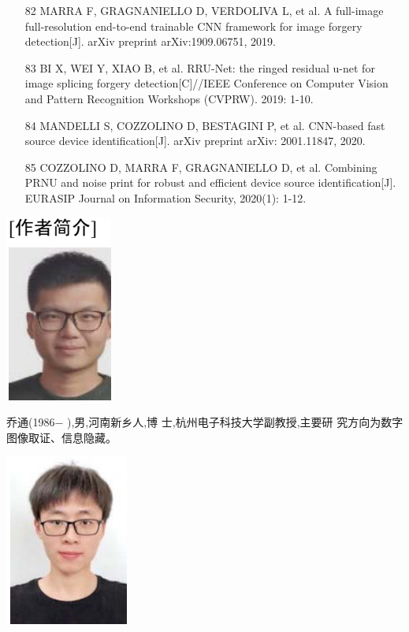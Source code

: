 \documentclass{article}
\begin{document}
\begin{itemize}
\item 
[82] MARRA F, GRAGNANIELLO D, VERDOLIVA L, et al. A full-image full-resolution end-to-end trainable CNN framework for image forgery detection[J]. arXiv preprint arXiv:1909.06751, 2019.

\item 
[83] BI X, WEI Y, XIAO B, et al. RRU-Net: the ringed residual u-net for image splicing forgery detection[C]//IEEE Conference on Computer Vision and Pattern Recognition Workshops (CVPRW). 2019: 1-10.

\item 
[84] MANDELLI S, COZZOLINO D, BESTAGINI P, et al. CNN-based fast source device identification[J]. arXiv preprint arXiv: 2001.11847, 2020.

\item 
[85] COZZOLINO D, MARRA F, GRAGNANIELLO D, et al. Combining PRNU and noise print for robust and efficient device source identification[J]. EURASIP Journal on Information Security, 2020(1): 1-12.

\end{itemize}


\includegraphics{_page_15_Picture_15.png}


乔通(1986− ),男,河南新乡人,博 士,杭州电子科技大学副教授,主要研 究方向为数字图像取证、信息隐藏。


\includegraphics{_page_15_Picture_17.png}
\end{document}
